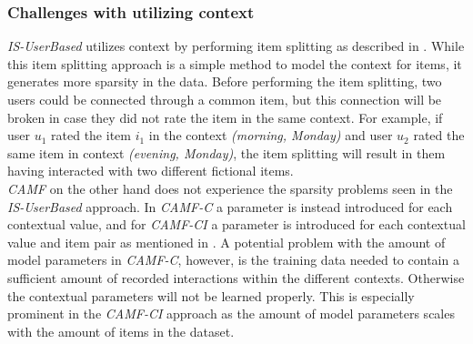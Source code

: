 \subsubsection{Challenges with utilizing context}
\textit{IS-UserBased} utilizes context by performing item splitting as described in .
While this item splitting approach is a simple method to model the context for items, it generates more sparsity in the data.
Before performing the item splitting, two users could be connected through a common item, but this connection will be broken in case they did not rate the item in the same context.
For example, if user $u_1$ rated the item $i_1$ in the context \textit{(morning, Monday)} and user $u_2$ rated the same item in context \textit{(evening, Monday)}, the item splitting will result in them having interacted with two different fictional items.\\
\textit{CAMF} on the other hand does not experience the sparsity problems seen in the \textit{IS-UserBased} approach.
In \textit{CAMF-C} a parameter is instead introduced for each contextual value, and for \textit{CAMF-CI} a parameter is introduced for each contextual value and item pair as mentioned in .
A potential problem with the amount of model parameters in \textit{CAMF-C}, however, is the training data needed to contain a sufficient amount of recorded interactions within the different contexts. 
Otherwise the contextual parameters will not be learned properly.
This is especially prominent in the \textit{CAMF-CI} approach as the amount of model parameters scales with the amount of items in the dataset.

